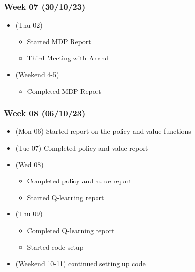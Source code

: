 \hypertarget{week-07-301023}{%
\subsubsection{Week 07 (30/10/23)}\label{week-07-301023}}

\begin{itemize}
\tightlist
\item
  (Thu 02)

  \begin{itemize}
  \tightlist
  \item
    Started MDP Report
  \item
    Third Meeting with Anand
  \end{itemize}
\item
  (Weekend 4-5)

  \begin{itemize}
  \tightlist
  \item
    Completed MDP Report
  \end{itemize}
\end{itemize}

\hypertarget{week-08-061023}{%
\subsubsection{Week 08 (06/10/23)}\label{week-08-061023}}

\begin{itemize}
\tightlist
\item
  (Mon 06) Started report on the policy and value functions
\item
  (Tue 07) Completed policy and value report
\item
  (Wed 08)

  \begin{itemize}
  \tightlist
  \item
    Completed policy and value report
  \item
    Started Q-learning report
  \end{itemize}
\item
  (Thu 09)

  \begin{itemize}
  \tightlist
  \item
    Completed Q-learning report
  \item
    Started code setup
  \end{itemize}
\item
  (Weekend 10-11) continued setting up code
\end{itemize}

